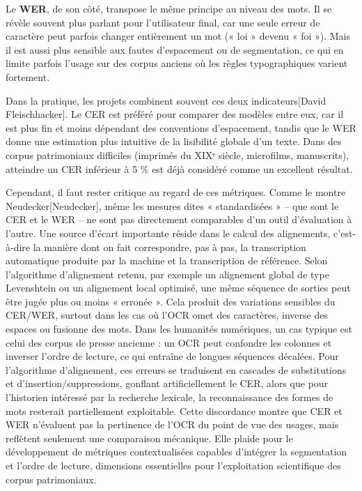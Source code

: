 Le \textbf{WER}, de son côté, transpose le même principe au niveau des mots. Il se révèle souvent plus parlant pour l’utilisateur final, car une seule erreur de caractère peut parfois changer entièrement un mot (« loi » devenu « foi »). Mais il est aussi plus sensible aux fautes d’espacement ou de segmentation, ce qui en limite parfois l’usage sur des corpus anciens où les règles typographiques varient fortement.

Dans la pratique, les projets combinent souvent ces deux indicateurs[David Fleischhacker]. Le CER est préféré pour comparer des modèles entre eux, car il est plus fin et moins dépendant des conventions d’espacement, tandis que le WER donne une estimation plus intuitive de la lisibilité globale d’un texte. Dans des corpus patrimoniaux difficiles (imprimés du XIXᵉ siècle, microfilms, manuscrits), atteindre un CER inférieur à 5 \% est déjà considéré comme un excellent résultat.

Cependant, il faut rester critique au regard de ces métriques. Comme le montre Neudecker[Neudecker], même les mesures dites « standardisées »  -- que sont le CER et le WER -- ne sont pas directement comparables d’un outil d’évaluation à l’autre. Une source d’écart importante réside dans le calcul des alignements, c’est-à-dire la manière dont on fait correspondre, pas à pas, la transcription automatique produite par la machine et la transcription de référence. Selon l’algorithme d’alignement retenu, par exemple un alignement global de type Levenshtein ou un alignement local optimisé, une même séquence de sorties peut être jugée plus ou moins « erronée ». Cela produit des variations sensibles du CER/WER, surtout dans les cas où l’OCR omet des caractères, inverse des espaces ou fusionne des mots. Dans les humanités numériques, un cas typique est celui des corpus de presse ancienne : un OCR peut confondre les colonnes et inverser l’ordre de lecture, ce qui entraîne de longues séquences décalées. Pour l’algorithme d’alignement, ces erreurs se traduisent en cascades de substitutions et d’insertion/suppressions, gonflant artificiellement le CER, alors que pour l’historien intéressé par la recherche lexicale, la reconnaissance des formes de mots resterait partiellement exploitable. Cette discordance montre que CER et WER n’évaluent pas la pertinence de l’OCR du point de vue des usages, mais reflètent seulement une comparaison mécanique. Elle plaide pour le développement de métriques contextualisées capables d’intégrer la segmentation et l’ordre de lecture, dimensions essentielles pour l’exploitation scientifique des corpus patrimoniaux.

